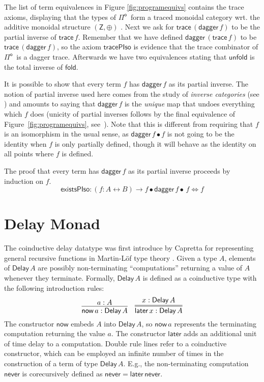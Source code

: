 \documentclass[runningheads,a4paper]{llncs}
\newcommand{\Pio}{\ensuremath{\mathsf{\Pi}^{\mathsf{o}}}}
\newcommand{\lr}{\longleftrightarrow}
\newcommand{\fold}{\mathsf{fold}}
\newcommand{\unfold}{\mathsf{unfold}}
\newcommand{\trace}{\ensuremath{\mathsf{trace}}}
\newcommand{\Z}{\mathsf{Z}}
\newcommand{\LR}{\iff}
\renewcommand{\dagger}{\mathsf{dagger}}
\newcommand{\Delay}{\ensuremath{\mathsf{Delay}\,}}
\newcommand{\now}{\mathsf{now}}
\newcommand{\later}{\mathsf{later}}
\newcommand{\never}{\mathsf{never}}
\begin{document}
The list of term equivalences in Figure \ref{fig:programequivs}
contains the trace axioms, displaying that the types of \Pio\ form a
traced monoidal category wrt. the additive monoidal structure
$(\Z,\oplus)$ \cite{JoyalSV96}. Next we ask for
$\trace\,(\dagger\,f)$ to be the partial inverse of
$\trace\,f$. Remember that we have defined $\dagger\,(\trace\,f)$ to
be $\trace\,(\dagger \,f)$, so the axiom $\mathsf{tracePIso}$
is evidence that the trace combinator of \Pio\ is a dagger trace.
Afterwards we have two equivalences stating that $\unfold$ is the
total inverse of $\fold$. 

It is possible to show that every term $f$ has $\dagger\,f$ as its partial
inverse. The notion of partial inverse used here comes from the study of
\emph{inverse categories} (see \cite{Kastl79}) and amounts to saying that
$\dagger\,f$ is the \emph{unique} map that undoes everything which $f$ does
(unicity of partial inverses follows by the final equivalence of
Figure~\ref{fig:programequivs}, see~\cite{Kastl79}). Note that this is
different from requiring that $f$ is an isomorphism in the usual sense, as
$\dagger\,f \bullet f$ is not going to be the identity when $f$ is only
partially defined, though it will behave as the identity on all points where
$f$ is defined.

The proof that every term has $\dagger\,f$ as its partial inverse
proceeds by induction on $f$.
\[
\mathsf{existsPIso} : (f : A \lr B) \to f \bullet \dagger\,f
\bullet\,f \LR f
\]


\section{Delay Monad}\label{sec:delay}

The coinductive delay datatype was first introduce by Capretta for
representing general recursive functions in Martin-L\"of type theory
\cite{Capretta05}.  Given a type $A$, elements of $\Delay A$ are
possibly non-terminating ``computations'' returning a value of $A$
whenever they terminate. Formally, $\Delay A$ is defined as a
coinductive type with the following introduction rules:
\[
\infer{\now\,a : \Delay A}{a : A}
\quad
\infer={\later\,x : \Delay A}{x : \Delay A}
\]
The constructor $\now$ embeds $A$ into $\Delay A$, so $\now\,a$
represents the terminating computation returning the value $a$. The
constructor $\later$ adds an additional unit of time delay to a
computation. Double rule lines refer to a coinductive constructor,
which can be employed an infinite number of times in the construction
of a term of type $\Delay A$.  E.g., the non-terminating computation
$\never$ is corecursively defined as $\never = \later \,\never$.
\end{document}
